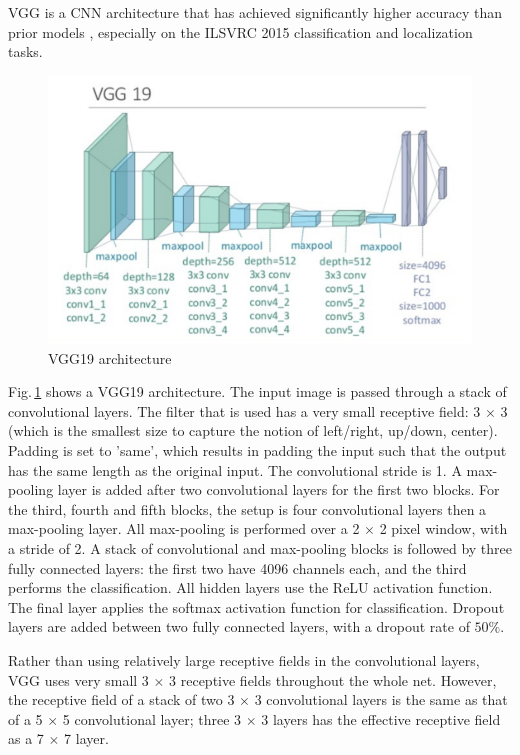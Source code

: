 VGG is a CNN architecture that has achieved significantly higher accuracy than prior models \citep{vgg}, especially on the ILSVRC 2015 \citep{ILSVRC15} classification and localization tasks. 

\begin{figure}[h]
	\centering
	\includegraphics[scale=0.4]{Figs/vgg.png}
    \caption{VGG19 architecture \citep{Zheng2018}}
    \label{VGG}
\end{figure}

  Fig.\,\ref{VGG} shows a VGG19 architecture. The input image is passed through a stack of convolutional layers. The filter that is used has a very small receptive field: 3 $\times$ 3 (which is the smallest size to capture the notion of left/right, up/down, center). Padding is set to 'same', which results in padding the input such that the output has the same length as the original input. The convolutional stride is 1. A max-pooling layer is added after two convolutional layers for the first two blocks. For the third, fourth and fifth blocks, the setup is four convolutional layers then a max-pooling layer. All max-pooling is performed over a 2 $\times$ 2 pixel window, with a stride of 2. A stack of convolutional and max-pooling blocks is followed by three fully connected layers: the first two have 4096 channels each, and the third performs the classification. All hidden layers use the ReLU activation function. The final layer applies the softmax activation function for classification. Dropout layers are added between two fully connected layers, with a dropout rate of $50\%$.

Rather than using relatively large receptive fields in the convolutional layers, VGG uses very small 3 $\times$ 3 receptive fields throughout the whole net. However, the receptive field of a stack of two 3 $\times$ 3 convolutional layers is the same as that of a 5 $\times$ 5 convolutional layer; three 3 $\times$ 3 layers has the effective receptive field as a 7 $\times$ 7 layer. 

